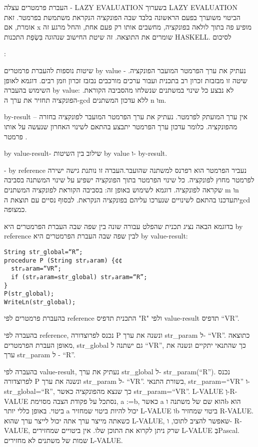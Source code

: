 \begin{טבלא}[!htbp]
        העברת פרמטרים עצלה - LAZY EVALUATION
        בשערוך LAZY EVALUATION הביטוי משוערך בפעם הראשונה בלבד שבה הפונקציה הנקראת משתמשת בפרמטר.
        זאת אומרת, אם x מופיע פה בתוך לולאה בפונקציה, מחשבים אותו רק פעם אחת, והחל מרגע זה שומרים את התוצאה. זה שיטת החישוב שנהוגה בִּשְׂפַת התכנות HASKELL.
        לסיכום

        :

        שיטות נוספות להעברת פרמטרים
        by value - נעתיק את ערך הפרמטר המועבר הפונקציה. שיטה זו מבזבזת זכרון רב בתכנית ועבור ערכים מורכבים נבזבז זכרון וזמן רבים.
        דוגמא לאופן השימוש בהעברה by value:
        לא נבצע כל שינוי במשתנים שנשלחו מהסביבה הקוראת.
        הפונקציה תחזיר את ערך ה-gcd ללא עדכון המשתנים n וm.

        by-result – אין ערך המועתק לפרמטר. נעתיק את ערך הפרמטר המועבר לפונקציה בחזרה מהפונקציה. כלומר עדכון ערך הפרמטר יתבצע בהתאם לשינוי האחרון שנעשה על אותו פרמטר .

        by value-result- שילוב בין השיטות by value ו- by-result.

        - by reference נעביר הפרמטר הוא רפרנס למשתנה שהועבר.העברה זו נותנת גישה ישירה לפרמטר מחוץ לפונקציה. כל שינוי הפרמטר בתוך הפונקציה ישפיע על שינוי המשתנה בסביבה שקראה לפונקציה.
        דוגמא לשימוש באופן זה:
        בסביבה הקוראת לפונקציה המשתנים m וn יתעדכנו בהתאם לשינויים שנערכו עליהם בפונקציה הנקראת.
        לבסוף נסיים עם תוצאת הgcd כמצופה.

        בדוגמא הבאה נציג תכנית שהפלט עבורה שונה בין שפה שבה העברת הפרמטרים היא by reference לבין שפה שבה העברת הפרמטרים היא by value-result:
\begin{verbatim}
String str_global=“R”;
procedure P (String strₚaram) {¢¢
  strₚaram=“VR”;
  if (strₚaram=str_global) strₚaram=“R”;
}
P(str_global);
WriteLn(str_global);
\end{verbatim}
        בהעברת פרמטרים לפי reference התכנית תדפיס "R" ולפי value-result תדפיס “VR”.

        בהעברה לפי reference, נכנס לפרוצדורה P ונשנה את ערך str\_param ל- “VR”. כתוצאה מאופן העברת הפרמטרים, str\_global גם ישתנה ל “VR”, כך שהתנאי יתקיים ונשנה את ערך str\_param ל - “R”.

        בהעברה לפי value-result, נעתיק את ערך str\_global ל- str\_param(“R”).
        נכנס לפרוצדורה P ונשנה את ערך str\_param ל- “VR”.
        בשורת התנאי, str\_param=“VR” ו- str\_global=“R”, כך שנצא מהפונקציה כאשר str\_param=“VR”.
        L-VALUE וְ-R-VALUE
        נסתכל על פקודת הצבה מסוימת, a :=b, כאשר a הוא שם של משתנה וb הוא ביטוי.
        באופן כללי יותר a יכול להיות ביטוי שמחזיר L-VALUE וb ביטוי שמחזיר R-VALUE.
        כשאתה מייצר ערך אתה יכול לייצר ערך שהוא L-VALUE, שאפשר להציב לתוכו, ו- R-VALUE, שרק ניתן לקרוא את התוכן שלו.
        אין ביטויים שמחזירים L-VALUE בְּPascal. שמות של משתנים לא מחזירים L-VALUE.


\end{טבלא}
